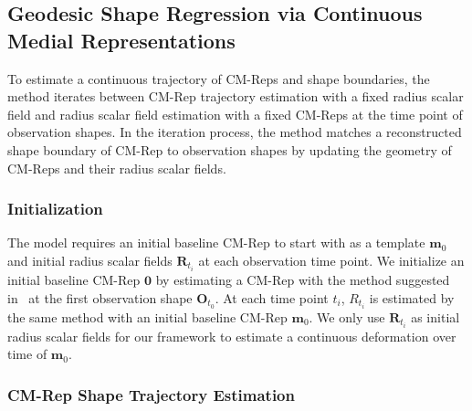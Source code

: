 \documentclass[runningheads,a4paper]{llncs}
\begin{document}
\subsection{Geodesic Shape Regression via Continuous Medial Representations}
\label{ssec:Regression}

To estimate a continuous trajectory of CM-Reps and shape boundaries, the method iterates between CM-Rep trajectory estimation with a fixed radius scalar field and radius scalar field estimation with a fixed CM-Reps at the time point of observation shapes. In the iteration process, the method matches a reconstructed shape boundary of CM-Rep to observation shapes by updating the geometry of CM-Reps and their radius scalar fields.

\subsubsection{Initialization}
The model requires an initial baseline CM-Rep to start with as a template $\mathbf{m}_0$ and initial radius scalar fields $\mathbf{R}_{t_i}$ at each observation time point. 
We initialize an initial baseline CM-Rep $\mathbf{0}$ by estimating a CM-Rep with the method suggested in~\cite{Yushkevich2009} at the first observation shape $\mathbf{O}_{t_0}$.
At each time point $t_i$, $R_{t_i}$ is estimated by the same method with an initial baseline CM-Rep $\mathbf{m}_0$. We only use $\mathbf{R}_{t_i}$ as initial radius scalar fields for our framework to estimate a continuous deformation over time of $\mathbf{m}_0$.

\subsubsection{CM-Rep Shape Trajectory Estimation}
\label{sssec:GeoUpdate}
\end{document}
